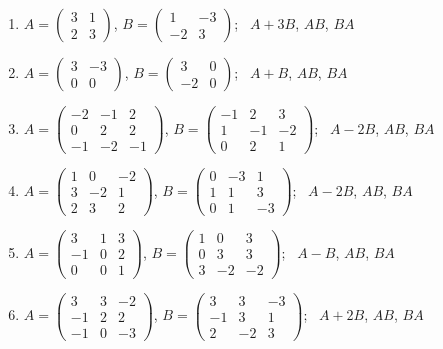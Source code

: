 \begin{enumerate}[label=\arabic*., leftmargin=*]
\item $A=\begin{pmatrix}3 & 1\\ 2 & 3\end{pmatrix}$, $B=\begin{pmatrix}1 & -3\\ -2 & 3\end{pmatrix}$; \ $A+3B$, $AB$, $BA$
\item $A=\begin{pmatrix}3 & -3\\ 0 & 0\end{pmatrix}$, $B=\begin{pmatrix}3 & 0\\ -2 & 0\end{pmatrix}$; \ $A+B$, $AB$, $BA$
\item $A=\begin{pmatrix}-2 & -1 & 2\\ 0 & 2 & 2\\ -1 & -2 & -1\end{pmatrix}$, $B=\begin{pmatrix}-1 & 2 & 3\\ 1 & -1 & -2\\ 0 & 2 & 1\end{pmatrix}$; \ $A-2B$, $AB$, $BA$
\item $A=\begin{pmatrix}1 & 0 & -2\\ 3 & -2 & 1\\ 2 & 3 & 2\end{pmatrix}$, $B=\begin{pmatrix}0 & -3 & 1\\ 1 & 1 & 3\\ 0 & 1 & -3\end{pmatrix}$; \ $A-2B$, $AB$, $BA$
\item $A=\begin{pmatrix}3 & 1 & 3\\ -1 & 0 & 2\\ 0 & 0 & 1\end{pmatrix}$, $B=\begin{pmatrix}1 & 0 & 3\\ 0 & 3 & 3\\ 3 & -2 & -2\end{pmatrix}$; \ $A-B$, $AB$, $BA$
\item $A=\begin{pmatrix}3 & 3 & -2\\ -1 & 2 & 2\\ -1 & 0 & -3\end{pmatrix}$, $B=\begin{pmatrix}3 & 3 & -3\\ -1 & 3 & 1\\ 2 & -2 & 3\end{pmatrix}$; \ $A+2B$, $AB$, $BA$

\end{enumerate}
